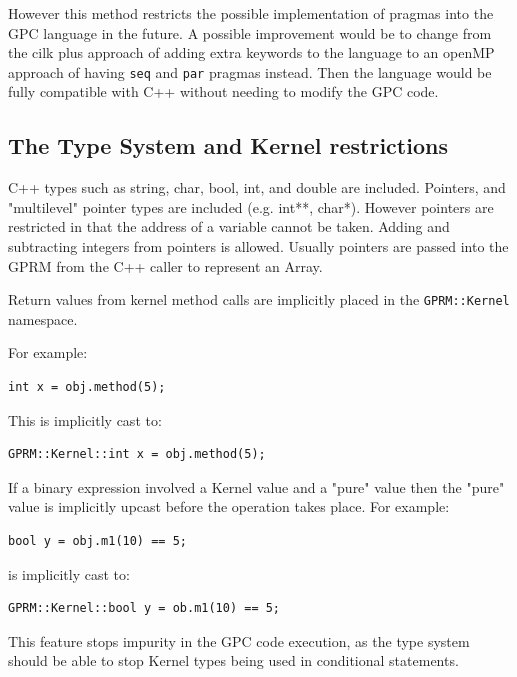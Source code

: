 However this method restricts the possible implementation of pragmas
into the GPC language in the future. A possible improvement would be to change
from the cilk plus approach of adding extra keywords to the language to an openMP
approach of having \texttt{seq} and \texttt{par} pragmas instead. Then the language
would be fully compatible with C++ without needing to modify the GPC code.

\subsection{The Type System and Kernel restrictions}
        C++ types such as string, char, bool, int, and double are included.
        Pointers, and "multilevel" pointer types are included (e.g. int**, char*).
        However pointers are restricted in that the address of a variable
        cannot be taken. Adding and subtracting integers
        from pointers is allowed. Usually pointers are passed into
        the GPRM from the C++ caller to represent an Array.

        Return values from kernel method calls are implicitly placed
        in the \texttt{GPRM::Kernel} namespace. 

For example:

\begin{lstlisting}[style=myGPC]
int x = obj.method(5);
\end{lstlisting}

This is implicitly cast to:

\begin{lstlisting}[style=myGPC]
GPRM::Kernel::int x = obj.method(5);
\end{lstlisting}     

If a binary expression involved a Kernel value and a "pure" value
then the "pure" value is implicitly upcast before the operation takes
place. For example:

\begin{lstlisting}[style=myGPC]
bool y = obj.m1(10) == 5;    
\end{lstlisting}

is implicitly cast to:

\begin{lstlisting}[style=myGPC]
GPRM::Kernel::bool y = ob.m1(10) == 5;
\end{lstlisting}

This feature stops impurity in the GPC code execution, as the type system
should be able to stop Kernel types being used in conditional
statements. 

